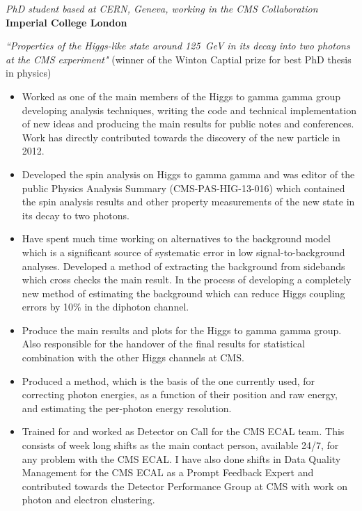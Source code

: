 \documentclass[margin, 10pt]{res} %
\begin{document}
\begin{resume}
{\sl PhD student based at CERN, Geneva, working in the CMS Collaboration}\\%
{\bf Imperial College London}

 {\sl ``Properties of the Higgs-like state around 125~GeV in its decay into two photons at the CMS experiment"} (winner of the Winton Captial prize for best PhD thesis in physics) \\

\begin{itemize} \itemsep -2pt %
\item Worked as one of the main members of the Higgs to gamma gamma group developing analysis techniques, writing the
code and technical implementation of new ideas and producing the main results for public notes and conferences.
Work has directly contributed towards the discovery of the new particle in 2012.
\item Developed the spin analysis on Higgs to gamma gamma and was editor of the public Physics Analysis Summary (CMS-PAS-HIG-13-016) which contained the spin analysis results and other property measurements of the new state in its decay to two photons.
\item Have spent much time working on alternatives to the background model which is a significant source of systematic error in low signal-to-background analyses. Developed a method of extracting the background from sidebands which cross checks the main result. In the process of developing a completely new method of estimating the background which can reduce Higgs coupling errors by 10\% in the diphoton channel.
\item Produce the main results and plots for the Higgs to gamma gamma group. Also responsible for the handover of
the final results for statistical combination with the other Higgs channels at CMS.
\item Produced a method, which is the basis of the one currently used, for correcting photon energies, as a function of their position and raw energy, and estimating the per-photon energy resolution.
\item Trained for and worked as Detector on Call for the CMS ECAL team. This consists of week long shifts as the main contact person, available 24/7, for any problem with the CMS ECAL. I have also done shifts in Data Quality Management for the CMS ECAL as a Prompt Feedback Expert and contributed towards the Detector Performance Group at CMS with work on photon and electron clustering.
\end{itemize}


\end{resume}
\end{document}

